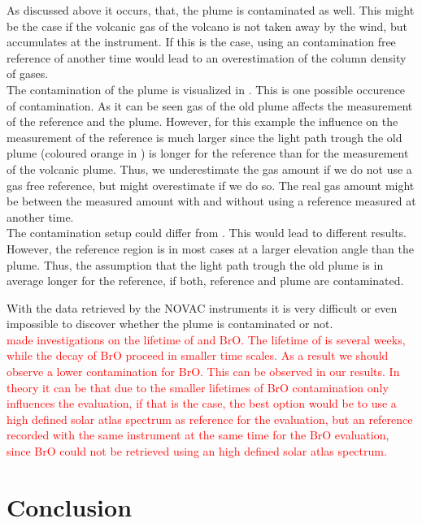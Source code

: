 \documentclass  [
  paper    = a4,
  BCOR     = 10mm,
  twoside,
  fontsize = 12pt,
  fleqn,
  toc      = bibnumbered,
  toc      = listofnumbered,
  numbers  = noendperiod,
  headings = normal,
  listof   = leveldown,
  version  = 3.03
]                                       {scrreprt}
\begin{document}
	 As discussed above it occurs, that, the plume is contaminated as well. This might be the case if the volcanic gas of the volcano is not taken away by the wind, but accumulates at the instrument. If this is the case, using an contamination free reference of another time would lead to an overestimation of the column density of gases.\\
	 The contamination of the plume is visualized in . This is one possible occurence of contamination. As it can be seen gas of the old plume affects the measurement of the reference and the plume. However, for this example the influence on the measurement of the reference is much larger since the light path trough the old plume (coloured orange in ) is longer for the reference than for the measurement of the volcanic plume. Thus, we underestimate the gas amount if we do not use a gas free reference, but might overestimate if we do so.
	 The real gas amount might be between the measured amount with and without using a reference measured at another time.\\
	 The contamination setup could differ from . This would lead to different results. However, the reference region is in most cases at a larger elevation angle than the plume. Thus, the assumption that the light path trough the old plume is in average longer for the reference, if both, reference and plume are contaminated.
	 
	  With the data retrieved by the NOVAC instruments it is very difficult or even impossible to discover whether the plume is contaminated or not. \\
	
	\textcolor{red}{
	\cite{geeignete quelle, irgendwo hab ich das schon gehoert} made investigations on the lifetime of  and BrO. The lifetime of  is several weeks, while the decay of BrO proceed in smaller time scales. As a result we should observe a lower contamination for BrO. This can be observed in our results. In theory it can be that due to the smaller lifetimes of BrO contamination only influences the  evaluation, if that is the case, the best option would be to use a high defined solar atlas spectrum as reference for the  evaluation, but an reference recorded with the same instrument at the same time for the BrO evaluation, since BrO could not be retrieved using an high defined solar atlas spectrum.}


	\chapter{Conclusion}
	
\end{document}
